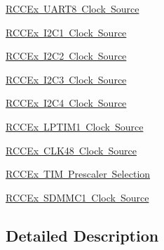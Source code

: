 \begin{DoxyCompactItemize}
\item 
\mbox{\hyperlink{group___r_c_c_ex___u_a_r_t8___clock___source}{R\+C\+C\+Ex U\+A\+R\+T8 Clock Source}}
\item 
\mbox{\hyperlink{group___r_c_c_ex___i2_c1___clock___source}{R\+C\+C\+Ex I2\+C1 Clock Source}}
\item 
\mbox{\hyperlink{group___r_c_c_ex___i2_c2___clock___source}{R\+C\+C\+Ex I2\+C2 Clock Source}}
\item 
\mbox{\hyperlink{group___r_c_c_ex___i2_c3___clock___source}{R\+C\+C\+Ex I2\+C3 Clock Source}}
\item 
\mbox{\hyperlink{group___r_c_c_ex___i2_c4___clock___source}{R\+C\+C\+Ex I2\+C4 Clock Source}}
\item 
\mbox{\hyperlink{group___r_c_c_ex___l_p_t_i_m1___clock___source}{R\+C\+C\+Ex L\+P\+T\+I\+M1 Clock Source}}
\item 
\mbox{\hyperlink{group___r_c_c_ex___c_l_k48___clock___source}{R\+C\+C\+Ex C\+L\+K48 Clock Source}}
\item 
\mbox{\hyperlink{group___r_c_c_ex___t_i_m___prescaler___selection}{R\+C\+C\+Ex T\+I\+M Prescaler Selection}}
\item 
\mbox{\hyperlink{group___r_c_c_ex___s_d_m_m_c1___clock___source}{R\+C\+C\+Ex S\+D\+M\+M\+C1 Clock Source}}
\end{DoxyCompactItemize}


\subsection{Detailed Description}
